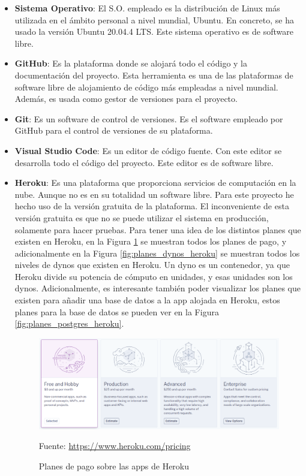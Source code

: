\begin{itemize}
\item \textbf{Sistema Operativo}: El S.O. empleado es la distribución de Linux más utilizada en el ámbito personal a nivel mundial, Ubuntu. En concreto, se ha usado la versión Ubuntu 20.04.4 LTS. Este sistema operativo es de software libre.
\item \textbf{GitHub}: Es la plataforma donde se alojará todo el código y la documentación del proyecto. Esta herramienta es una de las plataformas de software libre de alojamiento de código más empleadas a nivel mundial. Además, es usada como gestor de versiones para el proyecto.
\item \textbf{Git}: Es un software de control de versiones. Es el software empleado por GitHub para el control de versiones de su plataforma.
\item \textbf{Visual Studio Code}: Es un editor de código fuente. Con este editor se desarrolla todo el código del proyecto. Este editor es de software libre.
\item \textbf{Heroku}: Es una plataforma que proporciona servicios de computación en la nube. Aunque no es en su totalidad un software libre. Para este proyecto he hecho uso de la versión gratuita de la plataforma. El inconveniente de esta versión gratuita es que no se puede utilizar el sistema en producción, solamente para hacer pruebas. Para tener una idea de los distintos planes que existen en Heroku, en la Figura \ref{fig:planes_app_heroku} se muestran todos los planes de pago, y adicionalmente en la Figura \ref{fig:planes_dynos_heroku} se muestran todos los niveles de dynos que existen en Heroku. Un dyno es un contenedor, ya que Heroku divide su potencia de cómputo en unidades, y esas unidades son los dynos. Adicionalmente, es interesante también poder visualizar los planes que existen para añadir una base de datos a la app alojada en Heroku, estos planes para la base de datos se pueden ver en la Figura \ref{fig:planes_postgres_heroku}.

\begin{figure}[H]
\centering
\includegraphics[width=1.0\textwidth]{imagenes/05_Gestion/planes_heroku.png}
\begin{center}
Fuente: \url{https://www.heroku.com/pricing}
\end{center}
\caption{Planes de pago sobre las apps de Heroku}
\label{fig:planes_app_heroku}
\end{figure}


\end{itemize}
